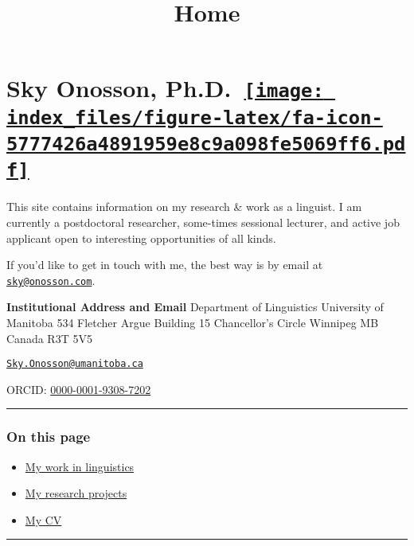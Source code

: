 \documentclass[
]{article}
\title{Home}
\author{}
\date{\vspace{-2.5em}}
\providecommand{\tightlist}{%
  \setlength{\itemsep}{0pt}\setlength{\parskip}{0pt}}
\begin{document}
\maketitle

\hypertarget{sky-onosson-ph.d.}{%
\section[Sky Onosson, Ph.D.~]{\texorpdfstring{Sky Onosson,
Ph.D.~\href{mailto:sky@onosson.com}{\protect\texttt{[image: index\_files/figure-latex/fa-icon-5777426a4891959e8c9a098fe5069ff6.pdf]}}}{Sky Onosson, Ph.D.~}}\label{sky-onosson-ph.d.}}

This site contains information on my research \& work as a linguist. I
am currently a postdoctoral researcher, some-times sessional lecturer,
and active job applicant open to interesting opportunities of all kinds.

If you'd like to get in touch with me, the best way is by email at
\href{mailto:sky@onosson.com}{\nolinkurl{sky@onosson.com}}.

\textbf{Institutional Address and Email} Department of Linguistics
University of Manitoba 534 Fletcher Argue Building 15 Chancellor's
Circle Winnipeg MB Canada R3T 5V5

\href{mailto:Sky.Onosson@umanitoba.ca}{\nolinkurl{Sky.Onosson@umanitoba.ca}}

ORCID: \href{https://orcid.org/0000-0001-9308-7202}{0000-0001-9308-7202}

\begin{center}\rule{0.5\linewidth}{0.5pt}\end{center}

\hypertarget{on-this-page}{%
\subsubsection{On this page}\label{on-this-page}}

\begin{itemize}
\tightlist
\item
  \protect\hyperlink{work}{My work in linguistics}
\item
  \protect\hyperlink{projects}{My research projects}
\item
  \protect\hyperlink{cv}{My CV}
\end{itemize}

\begin{center}\rule{0.5\linewidth}{0.5pt}\end{center}
\end{document}
